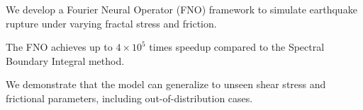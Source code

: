 \documentclass[draft]{agujournal2019}
\begin{document}





\begin{keypoints}
\item We develop a Fourier Neural Operator (FNO) framework to simulate earthquake rupture under varying fractal stress and friction.
\item The FNO achieves up to \(4 \times 10^5\) times speedup compared to the Spectral Boundary Integral method.
\item We demonstrate that the model can generalize to unseen shear stress and frictional parameters, including out-of-distribution cases.
\end{keypoints}

%
%

%
%
\end{document}
